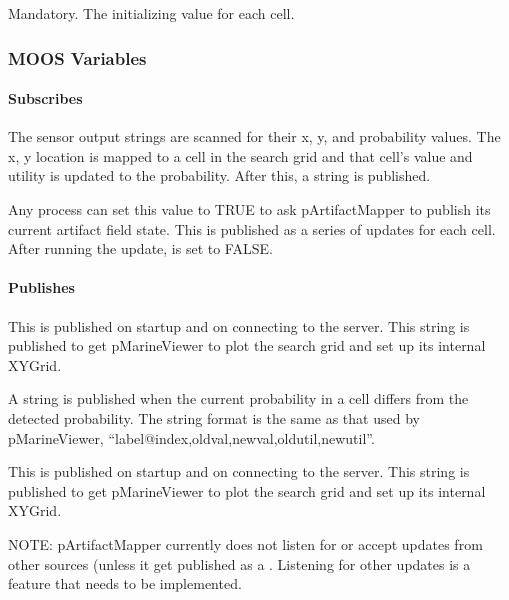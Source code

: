 \begin{hangpar}{\pin}{}
Mandatory. The initializing value for each cell.
\end{hangpar}

\subsubsection{MOOS Variables}
\paragraph{Subscribes}
\begin{hangpar}{\pin}{}
The sensor output strings are scanned for their x, y, and probability values.  The x, y location is mapped to a cell in the search grid and that cell's value and utility is updated to the probability.  After this, a  string is published.
\end{hangpar}
\begin{hangpar}{\pin}{}
Any process can set this value to TRUE to ask pArtifactMapper to publish its current artifact field state.  This is published as a series of  updates for each cell.  After running the update,  is set to FALSE.
\end{hangpar}
\paragraph{Publishes}
\begin{hangpar}{\pin}{}
This is published on startup and on connecting to the server.  This string is published to get pMarineViewer to plot the search grid and set up its internal XYGrid.
\end{hangpar}
\begin{hangpar}{\pin}{}
A  string is published when the current probability in a  cell differs from the detected probability.  The string format is the same as that used by pMarineViewer, ``label@index,oldval,newval,oldutil,newutil''.
\end{hangpar}
\begin{hangpar}{\pin}{}
This is published on startup and on connecting to the server.  This string is published to get pMarineViewer to plot the search grid and set up its internal XYGrid.
\end{hangpar}

NOTE:  pArtifactMapper currently does not listen for or accept updates from other sources (unless it get published as a .  Listening for other  updates is a feature that needs to be implemented.

